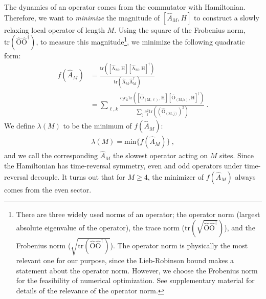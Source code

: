 \documentclass[twocolumn,superscriptaddress, prl,showpacs]{revtex4-1}
\begin{document}
The dynamics of an operator comes from the commutator with Hamiltonian.
Therefore, we want to {\it minimize} the magnitude of $[\hat{A}_M, H]$
to construct a slowly relaxing local operator of length $M$.
Using the square of the Frobenius norm, $\mathrm{tr(\hat{O}\hat{O}^\dag)}$, to measure this magnitude\footnote{There are three widely used norms of an operator;
the operator norm (largest absolute eigenvalue of the operator), the trace norm ($\mathrm{tr(\sqrt{\hat{O}\hat{O}^\dag})}$),
and the Frobenius norm ($\sqrt{\mathrm{tr(\hat{O}\hat{O}^\dag)}}$).
The operator norm is physically the most relevant one for our purpose, 
since the Lieb-Robinson bound makes a statement about the operator norm. 
However, we choose the Frobenius norm for the feasibility of numerical optimization. 
See supplementary material for details of the relevance of the operator norm.},
we minimize the following quadratic form:
\begin{align}\label{eq:minimize}
f(\hat{A}_M) &= \frac{\mathrm{tr([\hat{A}_M,H][\hat{A}_M,H]^\dag)}}{\mathrm{tr(\hat{A}_M\hat{A}^\dag_M)}} \nonumber\\
&= \sum_{\ell,k}\frac{c_\ell c_k \mathrm{tr([\hat{O}_{(M,\ell)},H][\hat{O}_{(M,k)},H]^\dag)}}{\sum_j c_j ^2 \mathrm{tr((\hat{O}_{(M,j)})^2)}} ~.
\end{align}
We define $\lambda(M)$ to be the minimum of $f(\hat{A}_M)$:
\begin{align}
\lambda(M) = \mathrm{min}\{f(\hat{A}_M)\} ~,
\end{align}
and we call the corresponding $\hat{A}_M$ the slowest operator acting on $M$ sites.
Since the Hamiltonian has time-reversal symmetry,
even and odd operators under time-reversal decouple.
It turns out that for $M\geq 4$, the minimizer of $f(\hat{A}_M)$ always comes from the even sector.
\end{document}
